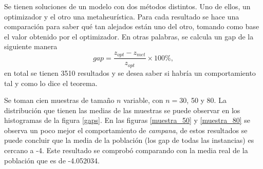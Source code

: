 \documentclass[12pt]{article}
\begin{document}
	Se tienen soluciones de un modelo con dos métodos distintos. Uno de ellos, un optimizador y el otro una metaheurística. Para cada resultado se hace una comparación para saber qué tan alejados están uno del otro, tomando como base el valor obtenido por el optimizador. En otras palabras, se calcula un gap de la siguiente manera
	\begin{equation*}
	gap = \frac{z_{opt} - z_{met}}{z_{opt}} \times 100 \%,
	\end{equation*}
	en total se tienen 3510 resultados y se desea saber si habría un comportamiento tal y como lo dice el teorema.
	
	Se toman cien muestras de tamaño $n$ variable, con $n=30$, 50 y 80. La distribución que tienen las medias de las muestras se puede observar en los histogramas de la figura \ref{gaps}. En las figuras \ref{muestra_50} y \ref{muestra_80} se observa un poco mejor el comportamiento de {\em campana}, de estos resultados se puede concluir que la media de la población (los gap de todas las instancias) es cercano a -4. Este resultado se comprobó comparando con la media real de la población que es de -4.052034.
	
\end{document}
